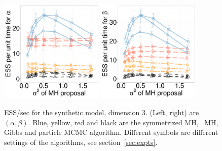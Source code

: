 \vspace{-.4in}
  \begin{figure}[H]
  \centering
  \begin{minipage}[h!]{0.65\linewidth}
  \centering
    \includegraphics [width=0.44\textwidth, angle=0]{figs/new_whole_exp_figs/exp_alpha_dim3.pdf}
    \includegraphics [width=0.44\textwidth, angle=0]{figs/new_whole_exp_figs/exp_beta_dim3.pdf}
  \end{minipage}
  \begin{minipage}[!hp]{0.33\linewidth}
    \caption{ESS/sec for the synthetic  model, dimension 3. (Left, right) 
      are $(\alpha, \beta)$. Blue, yellow, red and black are the symmetrized MH,
  \naive\ MH, Gibbs and particle MCMC algorithm. Different symbols are
different settings of the algorithms, see section~\ref{sec:expts}.}
     \label{fig:ESS_EXP_D33}
  \end{minipage}
  \end{figure}

